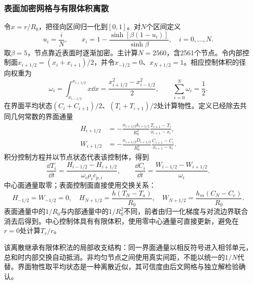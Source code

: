 \subsubsection{表面加密网格与有限体积离散}
令$x=r/R_0$，把径向区间归一化到$[0,1]$。对$N$个区间定义
\begin{equation}
u_i=\frac{i}{N},\qquad
x_i=1-\frac{\sinh[\beta(1-u_i)]}{\sinh\beta},
\quad i=0,\ldots,N .
\label{eq:mesh}
\end{equation}
取$\beta=5$，节点靠近表面时逐渐加密。主计算$N=2560$，含2561个节点。令内部控制面$x_{i+1/2}=(x_i+x_{i+1})/2$，并令$x_{-1/2}=0$、$x_{N+1/2}=1$。相应控制体积的径向权重为
\begin{equation}
\omega_i=\int_{x_{i-1/2}}^{x_{i+1/2}}x\dd x
=\frac{x_{i+1/2}^2-x_{i-1/2}^2}{2},
\qquad \sum_{i=0}^{N}\omega_i=\frac12 .
\end{equation}
在界面平均状态$(C_i+C_{i+1})/2$、$(T_i+T_{i+1})/2$处计算物性。定义已经除去共同几何常数的界面通量
\begin{equation}
\begin{aligned}
H_{i+1/2}&=-\frac{x_{i+1/2}k_{i+1/2}}{R_0^2}
\frac{T_{i+1}-T_i}{x_{i+1}-x_i},\\
W_{i+1/2}&=-\frac{x_{i+1/2}D_{i+1/2}}{R_0^2}
\frac{C_{i+1}-C_i}{x_{i+1}-x_i}.
\end{aligned}
\label{eq:fluxes}
\end{equation}
积分控制方程并以节点状态代表该控制体，得到
\begin{equation}
\frac{\dd T_i}{\dd t}
=\frac{H_{i-1/2}-H_{i+1/2}}{\omega_i\rho_i c_{p,i}},
\qquad
\frac{\dd C_i}{\dd t}
=\frac{W_{i-1/2}-W_{i+1/2}}{\omega_i}.
\label{eq:ode}
\end{equation}
中心面通量取零；表面控制面直接使用交换关系：
\begin{equation}
H_{-1/2}=W_{-1/2}=0,\quad
H_{N+1/2}=\frac{h(T_N-T_a)}{R_0},\quad
W_{N+1/2}=\frac{h_m(C_N-C_e)}{R_0}.
\label{eq:facebc}
\end{equation}
表面通量中的$1/R_0$与内部通量中的$1/R_0^2$不同，前者由归一化梯度与对流边界联合消去后得到。中心控制体具有有限体积，使用零中心通量可直接更新，避免在$r=0$处计算$T_r/r$。

该离散继承有限体积法的局部收支结构\cite{patankar}：同一界面通量以相反符号进入相邻单元，总和时内部交换自动抵消。非均匀节点之间使用真实间距，不能以统一的$1/N$代替。界面物性取平均状态是一种离散近似，其可信度由后文网格与独立解检验确认。

\nextpage
